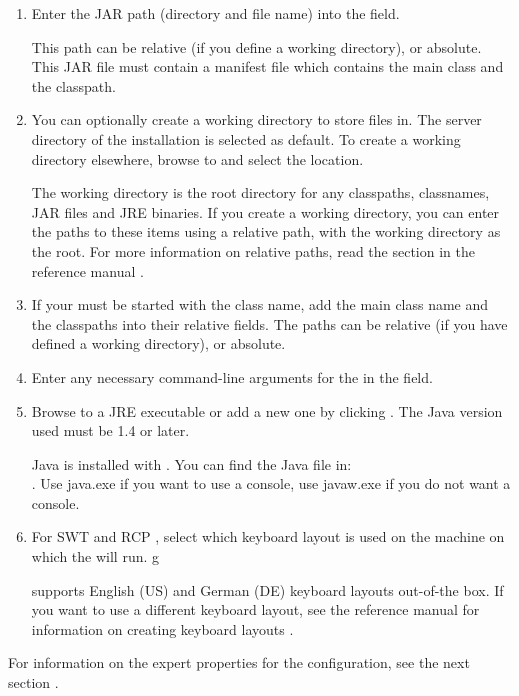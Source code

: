 \begin{enumerate}
\item Enter the JAR path (directory and file
  name) into the  field.  

This path can be relative (if you define a working directory), or absolute. This JAR file must contain a manifest file which contains the main class and the classpath. 

\item You can optionally create a working directory to store files in. The server directory of the \app{} installation is selected as default. To create a working directory elsewhere, browse to and select the location. 

The working directory is the root directory for any classpaths, classnames, JAR files and JRE binaries. If you create a working directory, you can enter the paths to these items using a relative path, with the working directory as the root. For more information on relative paths, read the section in the reference manual . 

\item If your \gdaut{} must be started with the class name, add the main class name and the classpaths into their relative fields. The paths can be relative (if you have defined a working directory), or absolute. 
\item Enter any necessary command-line arguments for the \gdaut{} in the
  field. 
\item Browse to a JRE executable or add a new one by clicking . 
The Java version used must be 1.4 or later. 

Java is installed with \app{}. You can find the Java file in:\\
.
Use java.exe if you want to use a console, use javaw.exe if you do not want a console. 
\item For SWT and RCP \gdauts{}, select which keyboard layout is used on the machine on which the \gdaut{} will run. 
g

\app{} supports English (US) and German (DE) keyboard layouts out-of-the box. If you want to use a different keyboard layout, see the reference manual for information on creating keyboard layouts . 
\end{enumerate}
For information on the expert properties for the \gdaut{} configuration, see the next section . 

